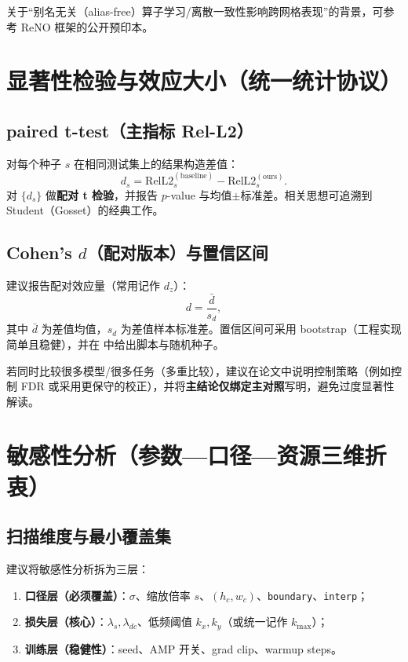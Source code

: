 关于“别名无关（alias-free）算子学习/离散一致性影响跨网格表现”的背景，可参考 ReNO 框架的公开预印本\cite{bartolucci2023reno}。

\section{显著性检验与效应大小（统一统计协议）}

\subsection{paired t-test（主指标 Rel-L2）}
对每个种子 $s$ 在相同测试集上的结果构造差值：
\begin{equation}
d_s=\mathrm{RelL2}^{(\mathrm{baseline})}_s-\mathrm{RelL2}^{(\mathrm{ours})}_s.
\end{equation}
对 $\{d_s\}$ 做\textbf{配对 t 检验}，并报告 $p$-value 与均值$\pm$标准差。相关思想可追溯到 Student（Gosset）的经典工作\cite{gosset1908}。

\subsection{Cohen’s \texorpdfstring{$d$}{d}（配对版本）与置信区间}
建议报告配对效应量（常用记作 $d_z$）：
\begin{equation}
d=\frac{\bar{d}}{s_d},
\end{equation}
其中 $\bar{d}$ 为差值均值，$s_d$ 为差值样本标准差。置信区间可采用 bootstrap（工程实现简单且稳健），并在  中给出脚本与随机种子。

\noindent
若同时比较很多模型/很多任务（多重比较），建议在论文中说明控制策略（例如控制 FDR 或采用更保守的校正），并将\textbf{主结论仅绑定主对照}写明，避免过度显著性解读。

\section{敏感性分析（参数—口径—资源三维折衷）}

\subsection{扫描维度与最小覆盖集}
建议将敏感性分析拆为三层：
\begin{enumerate}
  \item \textbf{口径层（必须覆盖）}：$\sigma$、缩放倍率 $s$、$(h_c,w_c)$、\texttt{boundary}、\texttt{interp}；
  \item \textbf{损失层（核心）}：$\lambda_s, \lambda_{dc}$、低频阈值 $k_x,k_y$（或统一记作 $k_{\max}$）；
  \item \textbf{训练层（稳健性）}：seed、AMP 开关、grad clip、warmup steps。
\end{enumerate}


